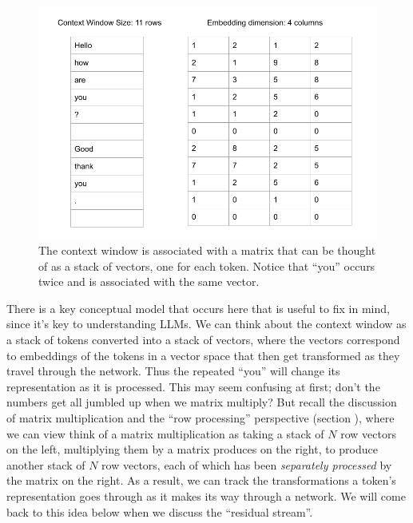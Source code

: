 \begin{figure}[ht]
\centering
\includegraphics[scale=.45]{./images/contextWindowAsStack.png}
\caption[Jeff Yoshimi]{The context window is associated with a matrix that can
be thought of as a stack of vectors, one for each token. Notice that ``you''
occurs twice and is associated with the same vector.
}
\label{embeddingMatrix}
\end{figure}

There is a key conceptual model that occurs here that is useful to fix in mind,
since it's key to understanding LLMs. We can think about the context window as
a stack of tokens converted into a stack of vectors, where the vectors
correspond to embeddings of the tokens in a vector space that then get
transformed as they travel through the network. Thus the repeated ``you'' will
change its representation as it is processed. This may seem confusing at first;
don't the numbers get all jumbled up when we matrix multiply? But recall the
discussion of matrix multiplication and the ``row processing'' perspective
(section ), where we can view think of a matrix
multiplication as taking a stack of $N$ row vectors on the left, multiplying
them by a matrix produces on the right, to produce another stack of $N$ row
vectors, each of which has been \emph{separately processed} by the matrix on
the right. As a result, we can track the transformations a token's
representation goes through as it makes its way through a network.  We will
come back to this idea below when we discuss the ``residual stream''. 


